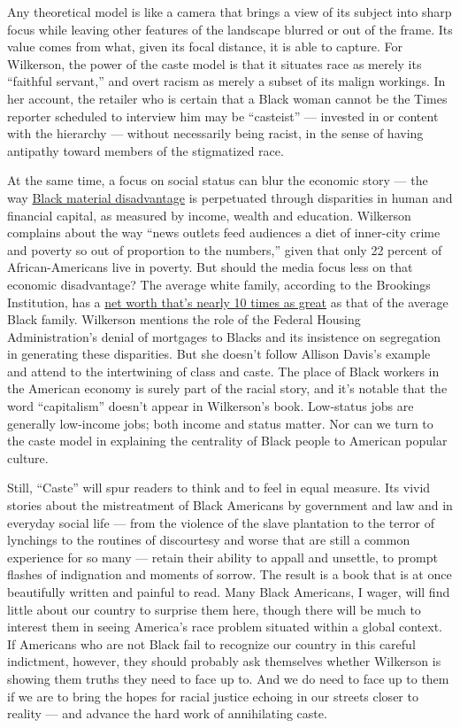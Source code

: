 Any theoretical model is like a camera that brings a view of its subject
into sharp focus while leaving other features of the landscape blurred
or out of the frame. Its value comes from what, given its focal
distance, it is able to capture. For Wilkerson, the power of the caste
model is that it situates race as merely its ``faithful servant,'' and
overt racism as merely a subset of its malign workings. In her account,
the retailer who is certain that a Black woman cannot be the Times
reporter scheduled to interview him may be ``casteist'' --- invested in
or content with the hierarchy --- without necessarily being racist, in
the sense of having antipathy toward members of the stigmatized race.

At the same time, a focus on social status can blur the economic story
--- the way
\href{https://www.nytimes.com/interactive/2019/08/14/magazine/racial-wealth-gap.html}{Black
material disadvantage} is perpetuated through disparities in human and
financial capital, as measured by income, wealth and education.
Wilkerson complains about the way ``news outlets feed audiences a diet
of inner-city crime and poverty so out of proportion to the numbers,''
given that only 22 percent of African-Americans live in poverty. But
should the media focus less on that economic disadvantage? The average
white family, according to the Brookings Institution, has a
\href{https://www.brookings.edu/blog/up-front/2020/02/27/examining-the-black-white-wealth-gap/}{net
worth that's nearly 10 times as great} as that of the average Black
family. Wilkerson mentions the role of the Federal Housing
Administration's denial of mortgages to Blacks and its insistence on
segregation in generating these disparities. But she doesn't follow
Allison Davis's example and attend to the intertwining of class and
caste. The place of Black workers in the American economy is surely part
of the racial story, and it's notable that the word ``capitalism''
doesn't appear in Wilkerson's book. Low-status jobs are generally
low-income jobs; both income and status matter. Nor can we turn to the
caste model in explaining the centrality of Black people to American
popular culture.

Still, ``Caste'' will spur readers to think and to feel in equal
measure. Its vivid stories about the mistreatment of Black Americans by
government and law and in everyday social life --- from the violence of
the slave plantation to the terror of lynchings to the routines of
discourtesy and worse that are still a common experience for so many ---
retain their ability to appall and unsettle, to prompt flashes of
indignation and moments of sorrow. The result is a book that is at once
beautifully written and painful to read. Many Black Americans, I wager,
will find little about our country to surprise them here, though there
will be much to interest them in seeing America's race problem situated
within a global context. If Americans who are not Black fail to
recognize our country in this careful indictment, however, they should
probably ask themselves whether Wilkerson is showing them truths they
need to face up to. And we do need to face up to them if we are to bring
the hopes for racial justice echoing in our streets closer to reality
--- and advance the hard work of annihilating caste.

